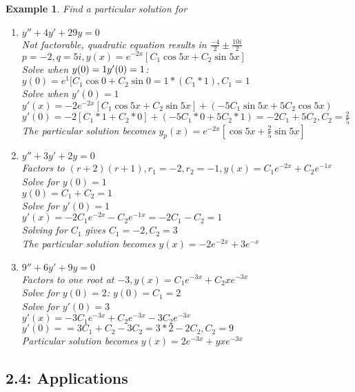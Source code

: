 \documentclass{article}
\newtheorem{example}{Example}
\begin{document}
\begin{example}
	Find a particular solution for 
	\begin{enumerate}
		\item $y''+4y'+29y=0$
			\\Not factorable, quadratic equation results in
			$\frac{-4}{2} \pm \frac{10i}{2}$
			\\$p=-2, q=5i, y(x)=e^{-2x}[C_1 \cos{5x} + C_2 \sin{5x}]$
			\\ Solve when $y(0)=1 
			\\y'(0)=1$: $y(0)=e^1 [C_1 \cos{0} + C_2 \sin{0} = 1*(C_1*1), C_1=1$
			\\ Solve when $y'(0)=1$
			\\$y'(x)=-2e^{-2x}[C_1 \cos{5x} + C_2 \sin{5x}]+(-5 C_1 \sin{5x}+5 C_2 \cos{5x})$
			\\$y'(0)=-2[C_1*1+C_2*0]+(-5 C_1 * 0 + 5 C_2 * 1) = -2C_1+5C_2, C_2=\frac{2}{5}$
			\\The particular solution becomes $y_p(x)=e^{-2x}[\cos{5x}+\frac{2}{5}\sin{5x}]$
		\item $y''+3y'+2y=0$
			\\Factors to $(r+2)(r+1), r_1=-2, r_2=-1, y(x)=C_1e^{-2x}+C_2e^{-1x}$
			\\Solve for $y(0)=1$
			\\$y(0)=C_1+C_2=1$
			\\Solve for $y'(0)=1$
			\\$y'(x)=-2 C_1 e^{-2x}-C_2e^{-1x}=-2 C_1- C_2=1$
			\\Solving for $C_1$ gives $C_1=-2, C_2=3$
			\\The particular solution becomes $y(x)=-2e^{-2x}+3e^{-x}$
		\item $9''+6y'+9y=0$
			\\Factors to one root at $-3, y(x)=C_1e^{-3x}+C_2xe^{-3x}$
			\\Solve for $y(0)=2$: $y(0)=C_1=2$
			\\Solve for $y'(0)=3$
			\\$y'(x)=-3C_1e^{-3x}+C_2e^{-3x}-3C_2e^{-3x}$
			\\$y'(0)==3C_1+C_2-3C_2=3*2-2C_2, C_2=9$
			\\Particular solution becomes $y(x)=2e^{-3x}+yxe^{-3x}$
	\end{enumerate}
\end{example}
\subsection{2.4: Applications}
\end{document}
